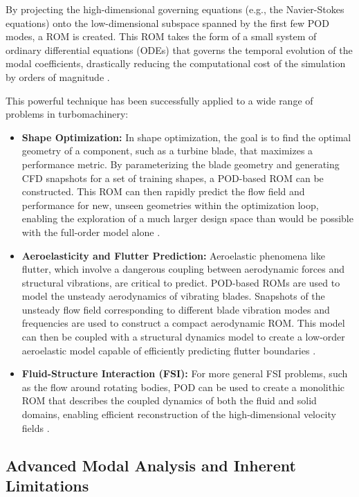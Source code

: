\documentclass[dsc, EN]{ufabcFHZh}
\begin{document}
By projecting the high-dimensional governing equations (e.g., the Navier-Stokes equations) onto the low-dimensional subspace spanned by the first few POD modes, a ROM is created. This ROM takes the form of a small system of ordinary differential equations (ODEs) that governs the temporal evolution of the modal coefficients, drastically reducing the computational cost of the simulation by orders of magnitude \citep{anonymous2022gaussian, synthesized2024}.

This powerful technique has been successfully applied to a wide range of problems in turbomachinery:
\begin{itemize}
    \item \textbf{Shape Optimization:} In shape optimization, the goal is to find the optimal geometry of a component, such as a turbine blade, that maximizes a performance metric. By parameterizing the blade geometry and generating CFD snapshots for a set of training shapes, a POD-based ROM can be constructed. This ROM can then rapidly predict the flow field and performance for new, unseen geometries within the optimization loop, enabling the exploration of a much larger design space than would be possible with the full-order model alone \citep{synthesized2024, paper_pdf}.
    \item \textbf{Aeroelasticity and Flutter Prediction:} Aeroelastic phenomena like flutter, which involve a dangerous coupling between aerodynamic forces and structural vibrations, are critical to predict. POD-based ROMs are used to model the unsteady aerodynamics of vibrating blades. Snapshots of the unsteady flow field corresponding to different blade vibration modes and frequencies are used to construct a compact aerodynamic ROM. This model can then be coupled with a structural dynamics model to create a low-order aeroelastic model capable of efficiently predicting flutter boundaries \citep{kelly2021projection, geyling2003new, bourguet_10084}.
    \item \textbf{Fluid-Structure Interaction (FSI):} For more general FSI problems, such as the flow around rotating bodies, POD can be used to create a monolithic ROM that describes the coupled dynamics of both the fluid and solid domains, enabling efficient reconstruction of the high-dimensional velocity fields \citep{synthesized2024}.
\end{itemize}

\subsection{Advanced Modal Analysis and Inherent Limitations}
\end{document}
